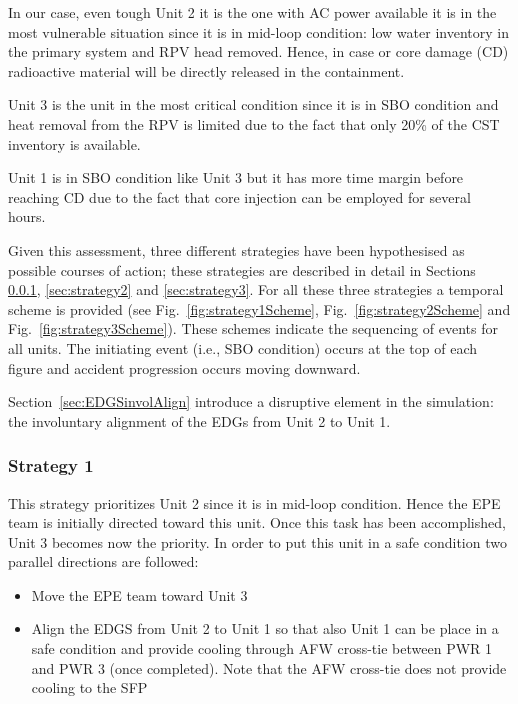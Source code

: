 In our case, even tough Unit 2 it is the one with AC power available it is in the most vulnerable situation since it 
is in mid-loop condition: low water inventory in the primary system and RPV head removed. Hence, in case or core damage
(CD) radioactive material will be directly released in the containment.

Unit 3 is the unit in the most critical condition since it is in SBO condition and heat removal from the RPV is limited
due to the fact that only 20\% of the CST inventory is available.

Unit 1 is in SBO condition like Unit 3 but it has more time margin before reaching CD due to the fact that core injection 
can be employed for several hours.

Given this assessment, three different strategies have been hypothesised as possible courses of action; these strategies
are described in detail in Sections \ref{sec:strategy1}, \ref{sec:strategy2} and \ref{sec:strategy3}.
For all these three strategies a temporal scheme is provided (see Fig.~\ref{fig:strategy1Scheme}, 
Fig.~\ref{fig:strategy2Scheme} and Fig.~\ref{fig:strategy3Scheme}). These schemes indicate the sequencing of events 
for all units. The initiating event (i.e., SBO condition) occurs at the top of each figure and accident progression 
occurs moving downward.

Section~\ref{sec:EDGSinvolAlign} introduce a disruptive element in the simulation: the involuntary alignment of the EDGs
from Unit 2 to Unit 1.


\subsubsection{Strategy 1}
\label{sec:strategy1}
This strategy prioritizes Unit 2 since it is in mid-loop condition. Hence the EPE team is initially directed toward
this unit. 
Once this task has been accomplished, Unit 3 becomes now the priority. In order to put this unit in a safe 
condition two parallel directions are followed:

\begin{itemize}
  \item Move the EPE team toward Unit 3 
  \item Align the EDGS from Unit 2 to Unit 1 so that also Unit 1 can be place in a safe condition and provide cooling 
        through AFW cross-tie between PWR 1 and PWR 3 (once completed). Note that the AFW cross-tie does not provide 
        cooling to the SFP
\end{itemize}

